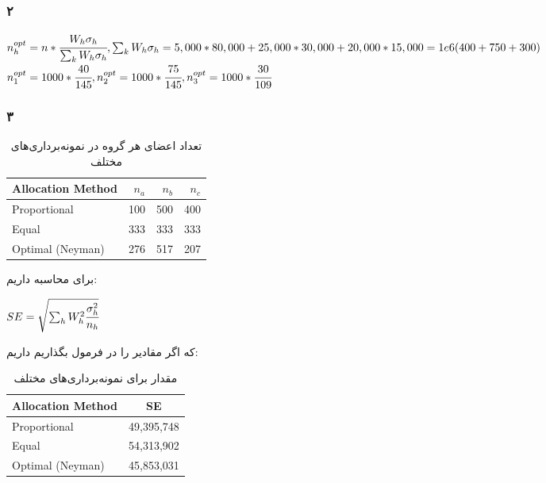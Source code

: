 \documentclass[12pt]{article}
\begin{document}
	\subsubsection{۲}
	\begin{latin}
		$
		n_h^{opt} = n * \cfrac{W_h\sigma_h}{\sum_k W_h\sigma_h} , 
		\sum_k W_h\sigma_h = 5,000 * 80,000 + 25,000 * 30,000 + 20,000 * 15,000 = 1e6 (400 + 750 + 300) 
		$
		\\
		$
		n_1^{opt} =1000 * \cfrac{40}{145} , n_2^{opt} = 1000 * \cfrac{75}{145}, n_3^{opt} = 1000 * \cfrac{30}{109}
		$
	\end{latin}
	\subsubsection{۳}
	 \begin{table}[ht]
		\centering
		\caption{تعداد اعضای هر گروه در نمونه‌برداری‌های مختلف}
		\begin{latin}
			\begin{tabular}{|l|r|r|r|}
				\hline
				Allocation Method & $n_a$ & $n_b$ & $n_c$ \\
				\hline
				Proportional & 100 & 500 & 400  \\
				Equal & 333 & 333 & 333 \\
				Optimal (Neyman) & 276 & 517 & 207 \\
				\hline
			\end{tabular}
		\end{latin}
	\end{table}
	برای محاسبه 
	داریم:
	\begin{latin}
		$
		SE = \sqrt{\sum_h W_h^2 \cfrac{\sigma_h^2}{n_h}} 
		$
	\end{latin}
	که اگر مقادیر را در فرمول بگذاریم داریم:
		 \begin{table}[ht] 
		\centering
		
		\caption{مقدار  برای نمونه‌برداری‌های مختلف}
		\label{se_per_sampling}
		\begin{latin}
			\begin{tabular}{|l|c|} 
				\hline
				Allocation Method & SE \\
				\hline
				Proportional & 49,395,748  \\
				Equal &  54,313,902 \\
				Optimal (Neyman) & 45,853,031\\ 
				\hline
			\end{tabular}
		\end{latin}
	\end{table}
	
\end{document}
